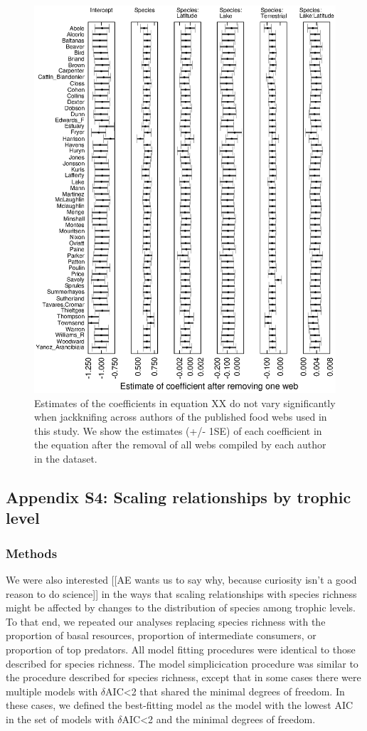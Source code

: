 \documentclass[12pt]{article}
\begin{document}
    \begin{figure}[h]
    \centerline{\includegraphics*[width=.8\textwidth]{Figures/Jackknife/Vul_author.eps}}
    \caption{Estimates of the coefficients in equation XX do not vary significantly
    when jackknifing across authors of the published food webs used in this study. 
    We show the estimates (+/- 1SE) of each coefficient
    in the equation after the removal of all webs compiled by each author in the dataset.}
    \label{Vul_web}
    \end{figure}


\subsection*{Appendix S4: Scaling relationships by trophic level}

  \subsubsection*{Methods}

    We were also interested [[AE wants us to say why, because curiosity isn't a good reason to do science]] 
    in the ways that scaling relationships with species richness might
    be affected by changes to the distribution of species among trophic levels. To
    that end, we repeated our analyses replacing species richness with the
    proportion of basal resources, proportion of intermediate consumers,
    or proportion of top predators. All model fitting procedures were identical to those
    described for species richness. The model simplicication procedure was similar to
    the procedure described for species richness, except that in some cases there were
    multiple models with $\delta$AIC\textless2 that shared the minimal degrees of freedom.
    In these cases, we defined the best-fitting model as the model with the lowest AIC in the
    set of models with $\delta$AIC\textless2 and the minimal degrees of freedom.
\end{document}
